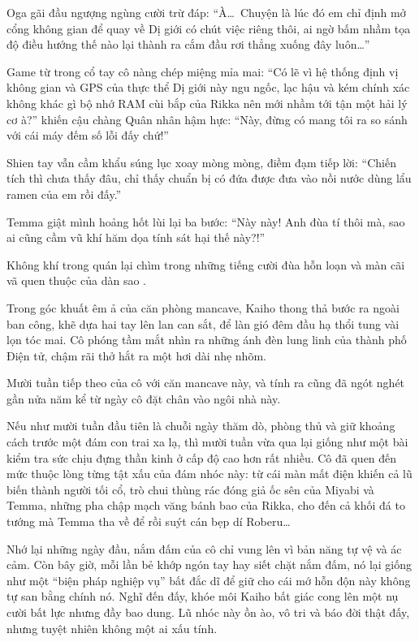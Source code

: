 \documentclass[../main.tex]{subfiles}
\begin{document}
Oga gãi đầu ngượng ngùng cười trừ đáp: ``À\dots\ Chuyện là lúc đó em chỉ định mở cổng không gian để quay về Dị giới có chút việc riêng thôi, ai ngờ bấm nhầm tọa độ điều hướng thế nào lại thành ra cắm đầu rơi thẳng xuống đây luôn\dots''

Game từ trong cổ tay cô nàng chép miệng mỉa mai: ``Có lẽ vì hệ thống định vị không gian và GPS của thực thể Dị giới này ngu ngốc, lạc hậu và kém chính xác không khác gì bộ nhớ RAM cùi bắp của Rikka nên mới nhầm tới tận một hải lý cơ à?'' khiến cậu chàng Quân nhân hậm hực: ``Này, đừng có mang tôi ra so sánh với cái máy đếm số lỗi đấy chứ!''

Shien tay vẫn cầm khẩu súng lục xoay mòng mòng, điềm đạm tiếp lời: ``Chiến tích thì chưa thấy đâu, chỉ thấy chuẩn bị có đứa được đưa vào nồi nước dùng lẩu ramen của em rồi đấy.''

Temma giật mình hoảng hốt lùi lại ba bước: ``Này này! Anh đùa tí thôi mà, sao ai cũng cầm vũ khí hăm dọa tính sát hại thế này?!''

Không khí trong quán lại chìm trong những tiếng cười đùa hỗn loạn và màn cãi vã quen thuộc của dàn sao \hls.

Trong góc khuất êm ả của căn phòng mancave, Kaiho thong thả bước ra ngoài ban công, khẽ dựa hai tay lên lan can sắt, để làn gió đêm đầu hạ thổi tung vài lọn tóc mai. Cô phóng tầm mắt nhìn ra những ánh đèn lung linh của thành phố Điện tử, chậm rãi thở hắt ra một hơi dài nhẹ nhõm.

Mười tuần tiếp theo của cô với căn mancave này, và tính ra cũng đã ngót nghét gần nửa năm kể từ ngày cô đặt chân vào ngôi nhà này.

Nếu như mười tuần đầu tiên là chuỗi ngày thăm dò, phòng thủ và giữ khoảng cách trước một đám con trai xa lạ, thì mười tuần vừa qua lại giống như một bài kiểm tra sức chịu đựng thần kinh ở cấp độ cao hơn rất nhiều. Cô đã quen đến mức thuộc lòng từng tật xấu của đám nhóc này: từ cái màn mất điện khiến cả lũ biến thành người tối cổ, trò chui thùng rác đóng giả ốc sên của Miyabi và Temma, những pha chập mạch văng bánh bao của Rikka, cho đến cả khối đá to tướng mà Temma tha về để rồi suýt cán bẹp dí Roberu\dots

Nhớ lại những ngày đầu, nắm đấm của cô chỉ vung lên vì bản năng tự vệ và ác cảm. Còn bây giờ, mỗi lần bẻ khớp ngón tay hay siết chặt nắm đấm, nó lại giống như một ``biện pháp nghiệp vụ'' bất đắc dĩ để giữ cho cái mớ hỗn độn này không tự san bằng chính nó. Nghĩ đến đấy, khóe môi Kaiho bất giác cong lên một nụ cười bất lực nhưng đầy bao dung. Lũ nhóc này ồn ào, vô tri và báo đời thật đấy, nhưng tuyệt nhiên không một ai xấu tính.
\end{document}
